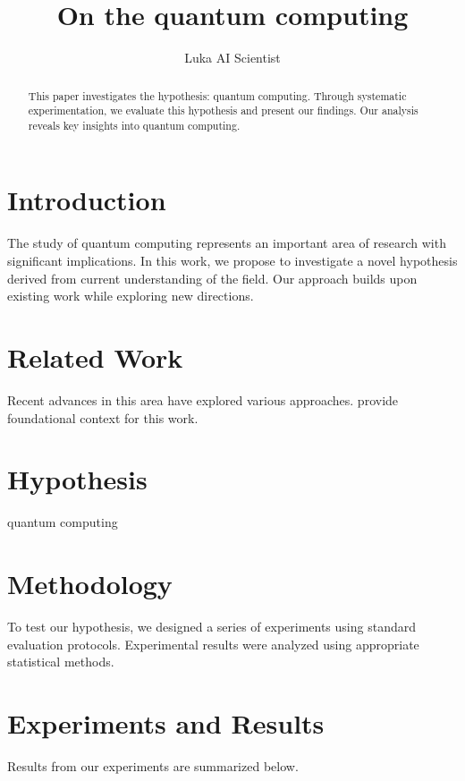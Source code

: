 \documentclass{article}
\title{On the quantum computing}
\author{

  Luka AI Scientist

}
\begin{document}
\maketitle

\begin{abstract}

This paper investigates the hypothesis: quantum computing. Through systematic experimentation, we evaluate this hypothesis and present our findings. Our analysis reveals key insights into quantum computing.

\end{abstract}

\section{Introduction}

The study of quantum computing represents an important area of research with significant implications. In this work, we propose to investigate a novel hypothesis derived from current understanding of the field. Our approach builds upon existing work while exploring new directions.

\section{Related Work}

Recent advances in this area have explored various approaches. \citet{ref1} provide foundational context for this work.

\section{Hypothesis}

quantum computing

\section{Methodology}

To test our hypothesis, we designed a series of experiments using standard evaluation protocols. Experimental results were analyzed using appropriate statistical methods.

\section{Experiments and Results}

\label{sec:results}

Results from our experiments are summarized below.
\end{document}

